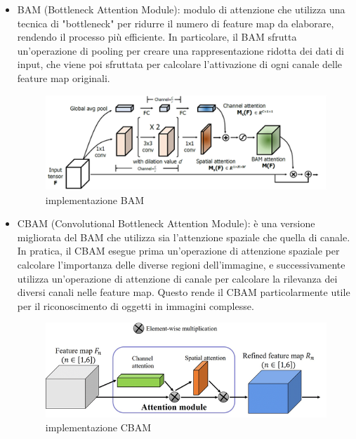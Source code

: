 \begin{itemize}
\begin{figure}
\begin{center}
        \end{center}
    \end{figure}
    \item BAM (Bottleneck Attention Module): modulo di attenzione che utilizza una tecnica di "bottleneck" per ridurre il numero di feature map da elaborare, rendendo il processo più efficiente. In particolare, il BAM sfrutta un'operazione di pooling per creare una rappresentazione ridotta dei dati di input, che viene poi sfruttata per calcolare l'attivazione di ogni canale delle feature map originali.
    \begin{figure}
        \begin{center}    
            \includegraphics[width=0.9\linewidth]{images/7.png}
            \caption{implementazione BAM}
        \end{center}
    \end{figure}
    \item CBAM (Convolutional Bottleneck Attention Module): è una versione migliorata del BAM che utilizza sia l'attenzione spaziale che quella di canale. In pratica, il CBAM esegue prima un'operazione di attenzione spaziale per calcolare l'importanza delle diverse regioni dell'immagine, e successivamente utilizza un'operazione di attenzione di canale per calcolare la rilevanza dei diversi canali nelle feature map. Questo rende il CBAM particolarmente utile per il riconoscimento di oggetti in immagini complesse.   
    \begin{figure}
        \begin{center}    
            \includegraphics[width=0.9\linewidth]{images/8.png}
            \caption{implementazione CBAM}
        \end{center}
    \end{figure} 
\end{itemize}

